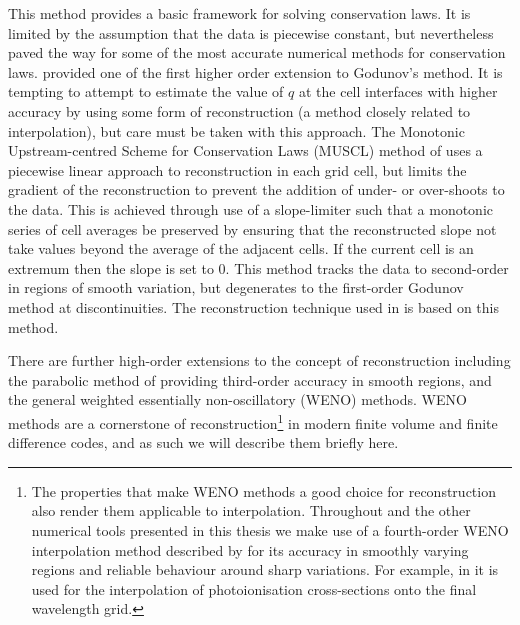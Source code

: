 This method provides a basic framework for solving conservation laws.
It is limited by the assumption that the data is piecewise constant, but nevertheless paved the way for some of the most accurate numerical methods for conservation laws.
\citet{VanLeer1979} provided one of the first higher order extension to Godunov's method.
It is tempting to attempt to estimate the value of $q$ at the cell interfaces with higher accuracy by using some form of reconstruction (a method closely related to interpolation), but care must be taken with this approach.
The Monotonic Upstream-centred  Scheme for Conservation Laws (MUSCL) method of \citet{VanLeer1979} uses a piecewise linear approach to reconstruction in each grid cell, but limits the gradient of the reconstruction to prevent the addition of under- or over-shoots to the data.
This is achieved through use of a slope-limiter such that a monotonic series of cell averages be preserved by ensuring that the reconstructed slope not take values beyond the average of the adjacent cells.
If the current cell is an extremum then the slope is set to 0.
This method tracks the data to second-order in regions of smooth variation, but degenerates to the first-order Godunov method at discontinuities.
The reconstruction technique used in \Radyn{} is based on this method.

There are further high-order extensions to the concept of reconstruction including the parabolic method of \citet{Colella1984} providing third-order accuracy in smooth regions, and the general weighted essentially non-oscillatory (WENO) methods.
WENO methods are a cornerstone of reconstruction\footnote{The properties that make WENO methods a good choice for reconstruction also render them applicable to interpolation. Throughout \Lw{} and the other numerical tools presented in this thesis we make use of a fourth-order WENO interpolation method described by \citet{Janett2019} for its accuracy in smoothly varying regions and reliable behaviour around sharp variations. For example, in \Lw{} it is used for the interpolation of photoionisation cross-sections onto the final wavelength grid.} in modern finite volume and finite difference codes, and as such we will describe them briefly here.

